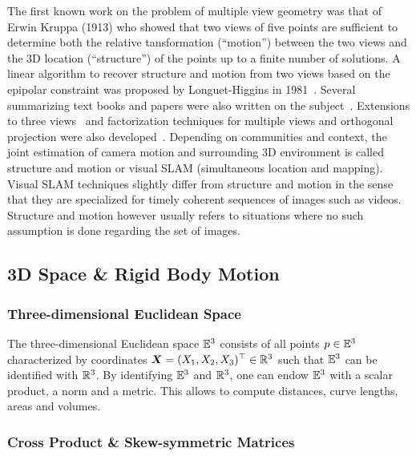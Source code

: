 The first known work on the problem of multiple view geometry was that of
Erwin Kruppa (1913) who showed that two views of five points
are sufficient to determine both the relative tansformation
(``motion'') between the two views and the 3D location (``structure'')
of the points up to a finite number of solutions.
A linear algorithm to recover structure and motion from two views based
on the epipolar constraint was proposed by Longuet-Higgins in 1981~\cite{longuet1981computer}.
Several summarizing text books and papers were also written
on the subject~\cite{faugeras1993three, weng1993optimal}.
Extensions to three views~\cite{spetsakis1987closed, shashua1994trilinearity}
and factorization techniques for multiple views and orthogonal projection were
also developed~\cite{tomasi1992shape}.
Depending on communities and context,
the joint estimation of camera motion and surrounding 3D environment is called
structure and motion or visual SLAM (simultaneous location and mapping).
Visual SLAM techniques slightly differ from structure and motion in the sense
that they are specialized for timely coherent sequences of images such as videos.
Structure and motion however usually refers to situations where no such assumption
is done regarding the set of images.

\subsection{3D Space \& Rigid Body Motion}%
\label{sub:3d_space_rigid_body_motion}

\subsubsection{Three-dimensional Euclidean Space}%
\label{ssub:three_dimensional_euclidean_space}

The three-dimensional Euclidean space $\mathbb{E}^3$ consists of all points
$p \in \mathbb{E}^3$ characterized by coordinates
$\bm{X} = (X_1, X_2, X_3)^{\top} \in \mathbb{R}^3$
such that $\mathbb{E}^3$ can be identified with $\mathbb{R}^3$.
By identifying $\mathbb{E}^3$ and $\mathbb{R}^3$,
one can endow $\mathbb{E}^3$ with a scalar product, a norm and a metric.
This allows to compute distances, curve lengths, areas and volumes.


\subsubsection{Cross Product \& Skew-symmetric Matrices}%
\label{ssub:cross_product_and_skew_symmetric_matrices}

